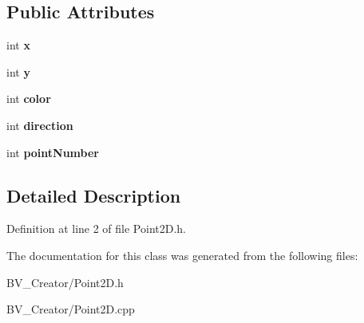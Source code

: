 \subsection*{Public Attributes}
\begin{DoxyCompactItemize}
\item 
\hypertarget{class_point2_d_a02041472ec3f1ec4d92a926bad5fe2c2}{
int {\bfseries x}}
\label{class_point2_d_a02041472ec3f1ec4d92a926bad5fe2c2}

\item 
\hypertarget{class_point2_d_adbb040f0e224303093e783dfcccd4886}{
int {\bfseries y}}
\label{class_point2_d_adbb040f0e224303093e783dfcccd4886}

\item 
\hypertarget{class_point2_d_aec1d8c7b6fd28a7b4b6e22228e122216}{
int {\bfseries color}}
\label{class_point2_d_aec1d8c7b6fd28a7b4b6e22228e122216}

\item 
\hypertarget{class_point2_d_a85ac869e635bff24b324e593147f2d2a}{
int {\bfseries direction}}
\label{class_point2_d_a85ac869e635bff24b324e593147f2d2a}

\item 
\hypertarget{class_point2_d_af33232f4fa2983b4964578ea6ef445fb}{
int {\bfseries pointNumber}}
\label{class_point2_d_af33232f4fa2983b4964578ea6ef445fb}

\end{DoxyCompactItemize}


\subsection{Detailed Description}


Definition at line 2 of file Point2D.h.

The documentation for this class was generated from the following files:\begin{DoxyCompactItemize}
\item 
BV\_\-Creator/Point2D.h\item 
BV\_\-Creator/Point2D.cpp\end{DoxyCompactItemize}
